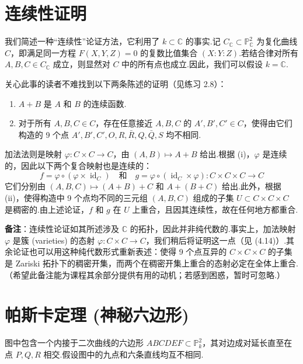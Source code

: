 \section{连续性证明}

我们简述一种“连续性”论证方法，它利用了 \(k \subset \mathbb{C}\) 的事实.记 \(C_\mathbb{C} \subset \mathbb{P}^2_\mathbb{C}\) 为复化曲线 \(C\)，即满足同一方程 \(F(X,Y,Z)=0\) 的复数比值集合 \((X:Y:Z)\).若结合律对所有 \(A, B, C \in C_\mathbb{C}\) 成立，则显然对 \(C\) 中的所有点也成立.因此，我们可以假设 \(k = \mathbb{C}\).

关心此事的读者不难找到以下两条陈述的证明（见练习 2.8）：

\begin{lemma}
\begin{enumerate}
    \item[(i)] \(A+B\) 是 \(A\) 和 \(B\) 的连续函数.
    \item[(ii)] 对于所有 \(A, B, C \in C\)，存在任意接近 \(A, B, C\) 的 \(A', B', C' \in C\)，使得由它们构造的 9 个点 \(A', B', C', O, R, \bar{R}, Q, \bar{Q}, S\) 均不相同.
\end{enumerate}
\end{lemma}

加法法则是映射 \(\varphi: C \times C \to C\)，由 \((A, B) \mapsto A+B\) 给出.根据 (i)，\(\varphi\) 是连续的，因此以下两个复合映射也是连续的：
\[
f = \varphi \circ (\varphi \times \operatorname{id}_C) \quad \text{和} \quad g = \varphi \circ (\operatorname{id}_C \times \varphi) : C \times C \times C \to C
\]
它们分别由 \((A, B, C) \mapsto (A+B)+C\) 和 \(A+(B+C)\) 给出.此外，根据 (ii)，使得构造中 9 个点均不同的三元组 \((A, B, C)\) 组成的子集 \(U \subset C \times C \times C\) 是稠密的.由上述论证，\(f\) 和 \(g\) 在 \(U\) 上重合，且因其连续性，故在任何地方都重合.

\textbf{备注}：连续性论证如其所述涉及 \(\mathbb{C}\) 的拓扑，因此并非纯代数的.事实上，加法映射 \(\varphi\) 是簇 (varieties) 的态射 \(\varphi: C \times C \to C\)，我们稍后将证明这一点（见 (4.14)）.其余论证也可以用这种纯代数形式重新表述：使得 9 个点互异的 \(C \times C \times C\) 的子集是 Zariski 拓扑下的稠密开集，而两个在稠密开集上重合的态射必定在全体上重合.（希望此备注能为课程其余部分提供有用的动机；若感到困惑，暂时可忽略.）

\section{帕斯卡定理 (神秘六边形)}

图中包含一个内接于二次曲线的六边形 \(ABCDEF \subset \mathbb{P}^2_k\)，其对边成对延长直至在点 \(P, Q, R\) 相交.假设图中的九点和六条直线均互不相同.

